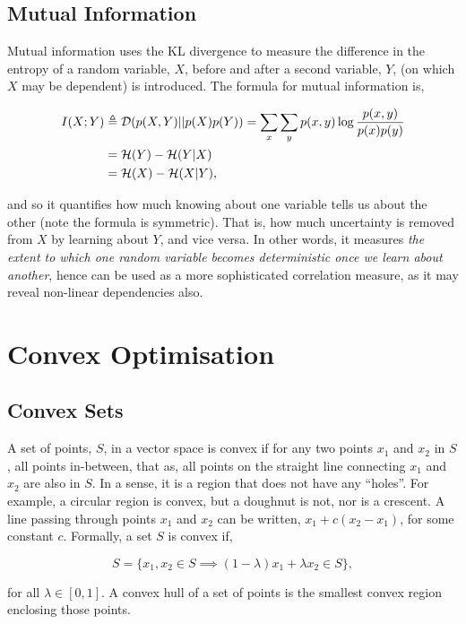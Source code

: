 \documentclass[11pt]{amsart}
\begin{document}
\subsection{Mutual Information}

Mutual information uses the KL divergence to measure the difference in the entropy of a random variable, $X$, before and after a second variable, $Y$, (on which $X$ may be dependent) is introduced. The formula for mutual information is,

\begin{align}
I(X; Y) &\triangleq \mathcal{D}(p(X, Y) || p(X)p(Y)) = \sum_x \sum_y p(x, y) \log\frac{p(x, y)}{p(x)p(y)}\notag \\
&= \mathcal{H}(Y) - \mathcal{H}(Y|X) \notag \\
&= \mathcal{H}(X) - \mathcal{H}(X|Y) \notag,
\end{align}

and so it quantifies how much knowing about one variable tells us about the other (note the formula is symmetric). That is, how much uncertainty is removed from $X$ by learning about $Y$, and vice versa. In other words, it measures \emph{the extent to which one random variable becomes deterministic once we learn about another}, hence can be used as a more sophisticated correlation measure, as it may reveal non-linear dependencies also.

\section{Convex Optimisation}
\subsection{Convex Sets}
A set of points, $S$, in a vector space is convex if for any two points $x_1$ and $x_2$ in $S$, all points in-between, that as, all points on the straight line connecting $x_1$ and $x_2$ are also in $S$. In a sense, it is a region that does not have any ``holes''. For example, a circular region is convex, but a doughnut is not, nor is a crescent. A line passing through points $x_1$ and $x_2$ can be written, $x_1 + c(x_2 - x_1)$, for some constant $c$. Formally, a set $S$ is convex if,

$$S = \Big\{x_1, x_2 \in S \implies (1 - \lambda) x_1 + \lambda x_2 \in S \Big\},$$

for all $\lambda \in [0, 1]$. A convex hull of a set of points is the smallest convex region enclosing those points.
\end{document}
